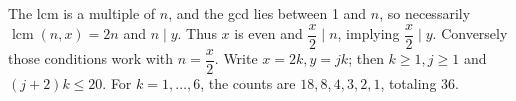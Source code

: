 The lcm is a multiple of $n$, and the gcd lies between 1 and $n$, so necessarily $\operatorname{lcm}(n,x)=2n$ and $n\mid y$. Thus $x$ is even and $\dfrac{x}{2} \mid n$, implying $\dfrac{x}{2} \mid y$. Conversely those conditions work with $n = \dfrac{x}{2}$. Write $x=2k,y=jk$; then $k\ge1,j\ge1$ and $(j+2)k\le20$. For $k=1,\ldots,6$, the counts are $18,8,4,3,2,1$, totaling $\boxed{36}$.
